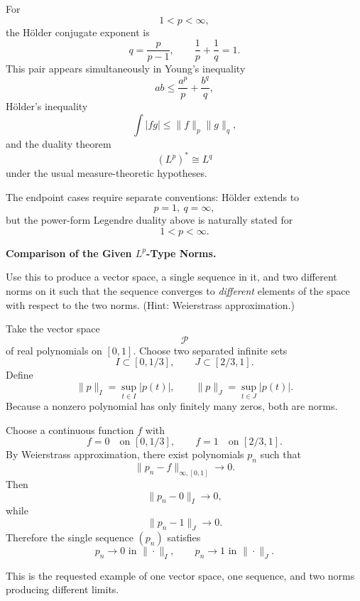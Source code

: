 \begin{solution}
For
\[
1<p<\infty,
\]
the Hölder conjugate exponent is
\[
q=\frac{p}{p-1},
\qquad
\frac1p+\frac1q=1.
\]
This pair appears simultaneously in Young's inequality
\[
ab
\le
\frac{a^p}{p}
+
\frac{b^q}{q},
\]
Hölder's inequality
\[
\int|fg|
\le
\|f\|_p\|g\|_q,
\]
and the duality theorem
\[
\boxed{
(L^p)^*\cong L^q
}
\]
under the usual measure-theoretic hypotheses.

The endpoint cases require separate conventions: Hölder extends to
\[
p=1,\ q=\infty,
\]
but the power-form Legendre duality above is naturally stated for
\[
1<p<\infty.
\]
\end{solution}


\begin{problem}[CP-II-0487]
\label{prob:cp-ii-0487}
\textbf{Comparison of the Given \(L^p\)-Type Norms.}

\hspace*{1.5em}Use this to produce a vector space, a single sequence in it, and two different norms on it
	such that the sequence converges to \emph{different} elements of the space with respect to the two norms.
	(Hint: Weierstrass approximation.)
\end{problem}

\begin{solution}
Take the vector space
\[
\mathcal P
\]
of real polynomials on \([0,1]\). Choose two separated infinite sets
\[
I\subset[0,1/3],
\qquad
J\subset[2/3,1].
\]
Define
\[
\|p\|_I=\sup_{t\in I}|p(t)|,
\qquad
\|p\|_J=\sup_{t\in J}|p(t)|.
\]
Because a nonzero polynomial has only finitely many zeros, both are norms.

Choose a continuous function \(f\) with
\[
f=0
\quad\text{on }[0,1/3],
\qquad
f=1
\quad\text{on }[2/3,1].
\]
By Weierstrass approximation, there exist polynomials \(p_n\) such that
\[
\|p_n-f\|_{\infty,[0,1]}\to0.
\]
Then
\[
\|p_n-0\|_I\to0,
\]
while
\[
\|p_n-1\|_J\to0.
\]
Therefore the single sequence \((p_n)\) satisfies
\[
\boxed{
p_n\to0
\text{ in }\|\cdot\|_I,
\qquad
p_n\to1
\text{ in }\|\cdot\|_J.
}
\]

This is the requested example of one vector space, one sequence, and two norms producing
different limits.
\end{solution}



